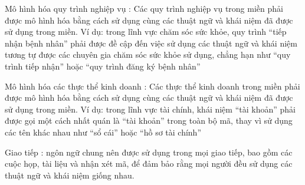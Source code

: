 Mô hình hóa quy trình nghiệp vụ : Các quy trình nghiệp vụ trong miền phải được mô hình hóa bằng cách sử dụng cùng các thuật ngữ và khái niệm đã được sử dụng trong miền. Ví dụ: trong lĩnh vực chăm sóc sức khỏe, quy trình “tiếp nhận bệnh nhân” phải được đề cập đến việc sử dụng các thuật ngữ và khái niệm tương tự được các chuyên gia chăm sóc sức khỏe sử dụng, chẳng hạn như “quy trình tiếp nhận” hoặc “quy trình đăng ký bệnh nhân”

Mô hình hóa các thực thể kinh doanh : Các thực thể kinh doanh trong miền phải được mô hình hóa bằng cách sử dụng cùng các thuật ngữ và khái niệm đã được sử dụng trong miền. Ví dụ: trong lĩnh vực tài chính, khái niệm “tài khoản” phải được gọi một cách nhất quán là “tài khoản” trong toàn bộ mã, thay vì sử dụng các tên khác nhau như “sổ cái” hoặc “hồ sơ tài chính”

Giao tiếp : ngôn ngữ chung nên được sử dụng trong mọi giao tiếp, bao gồm các cuộc họp, tài liệu và nhận xét mã, để đảm bảo rằng mọi người đều sử dụng các thuật ngữ và khái niệm giống nhau.
